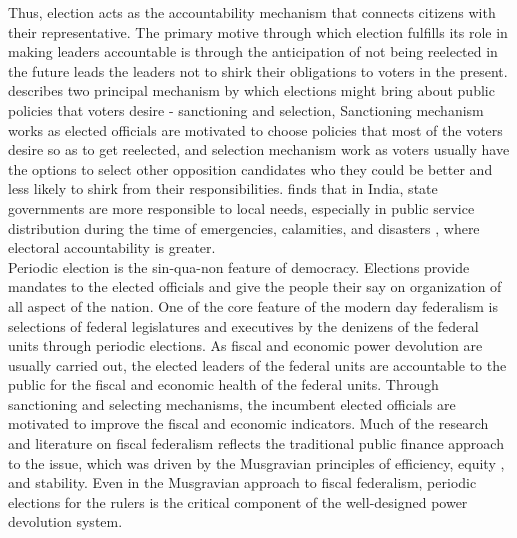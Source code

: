 Thus, election acts as the accountability mechanism that connects citizens with their representative. The primary motive through which election fulfills its role in making leaders accountable is through the anticipation of not being reelected in the future leads the leaders not to shirk their obligations to voters in the present\cite{Barro1973, Ferejohn1986, Manin1997}.  describes two principal mechanism by which elections might bring about public policies that voters desire - sanctioning and selection, Sanctioning mechanism works as elected officials are motivated to choose policies that most of the voters desire so as to get reelected, and selection mechanism work as voters usually have the options to select other opposition candidates who they could be better and less likely to shirk from their responsibilities. finds that in India, state governments are more responsible to local needs, especially in public service distribution during the time of emergencies, calamities, and disasters , where electoral accountability is greater.\\
Periodic election is the sin-qua-non feature of democracy. Elections provide mandates to the elected officials and give the people their say on organization of all aspect of the nation. One of the core feature of the modern day federalism is selections of federal legislatures and executives by the denizens of the federal units through periodic elections. As fiscal and economic power devolution are usually carried out, the elected leaders of the federal units are accountable to the public for the fiscal and economic health of the federal units. Through sanctioning and selecting mechanisms, the incumbent elected officials are motivated to improve the fiscal and economic indicators. Much of the research and literature on fiscal federalism reflects the traditional public finance approach to the issue\cite{Galligan1990}, which was driven by the Musgravian principles of efficiency, equity , and stability\cite{Musgrave1983}. Even in the Musgravian approach to fiscal federalism, periodic elections for the rulers is the critical component of the well-designed power devolution system.  \\
